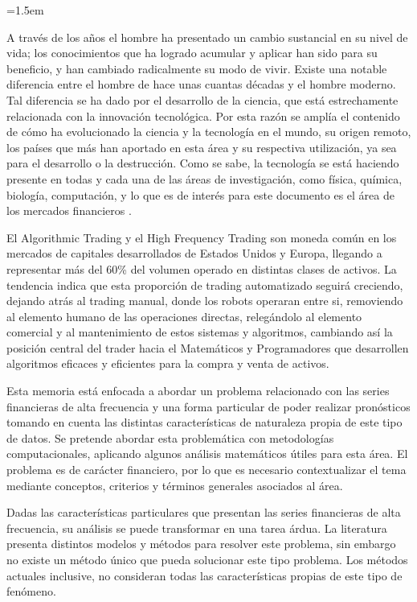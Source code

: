 \parindent=1.5em

A través de los años el hombre ha presentado un cambio sustancial en su nivel
de vida; los conocimientos que ha logrado acumular y aplicar han sido para su
beneficio, y han cambiado radicalmente su modo de vivir. Existe una notable
diferencia entre el hombre de hace unas cuantas décadas y el hombre moderno.
Tal diferencia se ha dado por el desarrollo de la ciencia, que está
estrechamente relacionada con la innovación tecnológica. Por esta razón se
amplía el contenido de cómo ha evolucionado la ciencia y la tecnología en el
mundo, su origen remoto, los países que más han aportado en esta área y su
respectiva utilización, ya sea para el desarrollo o la destrucción. Como se
sabe, la tecnología se está haciendo presente en todas y cada una de las áreas
de investigación, como física, química, biología, computación, y lo que es de
interés para este documento es el área de los mercados financieros
\cite{watsham1997quantitative}.

El Algorithmic Trading y el High Frequency Trading son moneda común en los mercados de capitales 
desarrollados de Estados Unidos y Europa, llegando a representar más del 60\% del 
volumen operado en distintas clases de activos. La tendencia indica que esta proporción 
de trading automatizado seguirá creciendo, dejando atrás al trading manual, donde 
los robots operaran entre si, removiendo al elemento 
humano de las operaciones directas, relegándolo al elemento comercial y al mantenimiento de 
estos sistemas y algoritmos, cambiando así la posición central del trader hacia 
el Matemáticos y Programadores que desarrollen algoritmos eficaces y eficientes 
para la compra y venta de activos.

Esta memoria está enfocada a abordar un problema relacionado con las series
financieras de alta frecuencia y una forma particular de poder realizar
pronósticos tomando en cuenta las distintas características de naturaleza
propia de este tipo de datos. Se pretende abordar esta problemática con
metodologías computacionales, aplicando algunos análisis matemáticos útiles
para esta área. El problema es de carácter financiero, por lo que es necesario
contextualizar el tema mediante conceptos, criterios y términos generales
asociados al área.

Dadas las características particulares que presentan las series financieras de
alta frecuencia, su análisis se puede transformar en una tarea árdua. La
literatura presenta distintos modelos y métodos para resolver este problema,
sin embargo no existe un método único que pueda solucionar este tipo problema.
Los métodos actuales inclusive, no consideran todas las características propias
de este tipo de fenómeno. %

